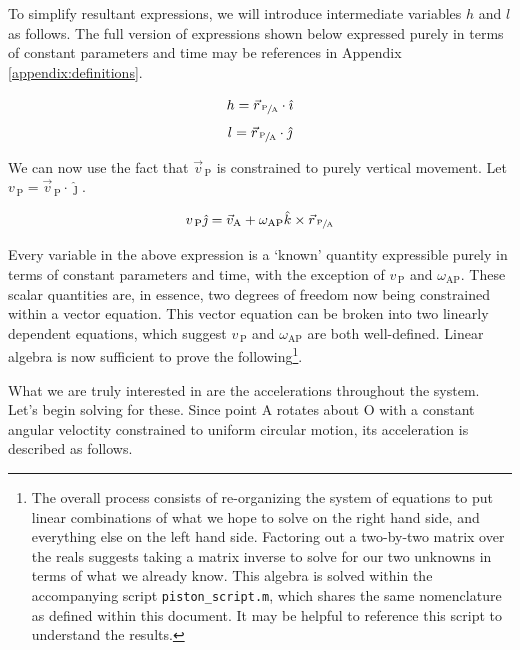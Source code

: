 \documentclass[nofoot,pdf-a,balance,colorlinks,upint,subscriptcorrection,varvw,mathalfa=cal=boondoxo]{asmeconf}
\begin{document}
    To simplify resultant expressions, we will introduce intermediate variables $h$ and $l$ as follows. The full version of expressions shown below expressed purely in terms of constant parameters and time may be references in Appendix \ref{appendix:definitions}.

    \begin{equation} 
        h = \vec{r}_{\,\sfrac{\textrm{P}}{\textrm{A}}} \cdot \hat{\imath}
    \end{equation}
    \begin{equation} 
        l = \vec{r}_{\,\sfrac{\textrm{P}}{\textrm{A}}} \cdot \hat{\jmath}
    \end{equation}

    
    We can now use the fact that $\vec{v}_{\,\textrm{P}}$ is constrained to purely vertical movement. Let $v_{\,\textrm{P}} = \vec{v}_{\,\textrm{P}} \cdot \hat{\jmath}$. 

    \begin{equation}\label{eq:velocity_system}
        v_{\,\textrm{P}}\hat{\jmath} = \vec{v}_{\textrm{A}} + \omega_{\textrm{AP}}\hat{k}\times \vec{r}_{\,\sfrac{\textrm{P}}{\textrm{A}}}
    \end{equation}

    Every variable in the above expression is a `known' quantity expressible purely in terms of constant parameters and time, with the exception of $v_{\,\textrm{P}}$ and $\omega_{\textrm{AP}}$. These scalar quantities are, in essence, two degrees of freedom now being constrained within a vector equation. This vector equation can be broken into two linearly dependent equations, which suggest $v_{\,\textrm{P}}$ and $\omega_{\textrm{AP}}$ are both well-defined. Linear algebra is now sufficient to prove the following\footnote{The overall process consists of re-organizing the system of equations to put linear combinations of what we hope to solve on the right hand side, and everything else on the left hand side. Factoring out a two-by-two matrix over the reals suggests taking a matrix inverse to solve for our two unknowns in terms of what we already know. This algebra is solved within the accompanying script \texttt{piston_script.m}, which shares the same nomenclature as defined within this document. It may be helpful to reference this script to understand the results.}.

    

    What we are truly interested in are the accelerations throughout the system. Let's begin solving for these. Since point A rotates about O with a constant angular veloctity constrained to uniform circular motion, its acceleration is described as follows.
\end{document}
